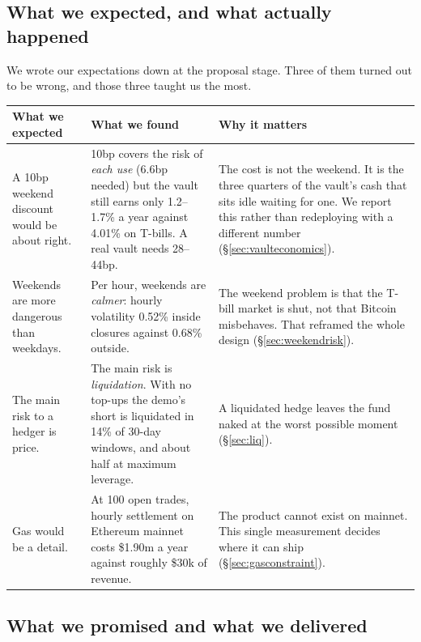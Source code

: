 \documentclass[11pt,a4paper]{article}
\begin{document}
\subsection{What we expected, and what actually happened}

We wrote our expectations down at the proposal stage. Three of them turned out to be wrong, and those
three taught us the most.

\begin{center}
\small
\begin{tabular}{@{}p{4.6cm}p{5.2cm}p{5.6cm}@{}}
\toprule
\textbf{What we expected} & \textbf{What we found} & \textbf{Why it matters} \\
\midrule
A 10bp weekend discount would be about right. & 10bp covers the risk of \emph{each use} (6.6bp needed) but the vault still earns only 1.2--1.7\% a year against 4.01\% on T-bills. A real vault needs 28--44bp. & The cost is not the weekend. It is the three quarters of the vault's cash that sits idle waiting for one. We report this rather than redeploying with a different number (\S\ref{sec:vaulteconomics}). \\
Weekends are more dangerous than weekdays. & Per hour, weekends are \emph{calmer}: hourly volatility 0.52\% inside closures against 0.68\% outside. & The weekend problem is that the T-bill market is shut, not that Bitcoin misbehaves. That reframed the whole design (\S\ref{sec:weekendrisk}). \\
The main risk to a hedger is price. & The main risk is \emph{liquidation}. With no top-ups the demo's short is liquidated in 14\% of 30-day windows, and about half at maximum leverage. & A liquidated hedge leaves the fund naked at the worst possible moment (\S\ref{sec:liq}). \\
Gas would be a detail. & At 100 open trades, hourly settlement on Ethereum mainnet costs \$1.90m a year against roughly \$30k of revenue. & The product cannot exist on mainnet. This single measurement decides where it can ship (\S\ref{sec:gasconstraint}). \\
\bottomrule
\end{tabular}
\end{center}

\subsection{What we promised and what we delivered}
\end{document}
